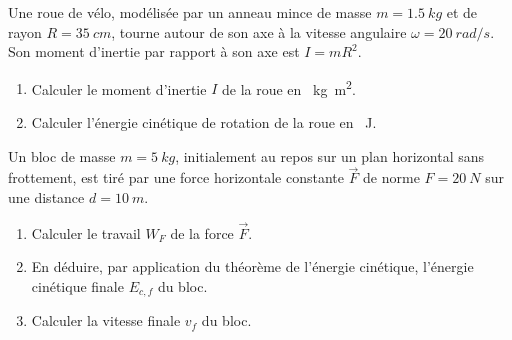 \documentclass[11pt]{article}
\begin{document}
\begin{exercice}
Une roue de vélo, modélisée par un anneau mince de masse $m = \SI{1,5}{kg}$ et de rayon $R = \SI{35}{cm}$, tourne autour de son axe à la vitesse angulaire $\omega = \SI{20}{rad/s}$. Son moment d'inertie par rapport à son axe est $I = mR^2$.
\begin{enumerate}
    \item Calculer le moment d'inertie $I$ de la roue en \SI{}{kg.m^2}.
    \item Calculer l'énergie cinétique de rotation de la roue en \SI{}{J}.
\end{enumerate}
\end{exercice}

\begin{exercice}
Un bloc de masse $m = \SI{5}{kg}$, initialement au repos sur un plan horizontal sans frottement, est tiré par une force horizontale constante $\vec{F}$ de norme $F = \SI{20}{N}$ sur une distance $d = \SI{10}{m}$.
\begin{enumerate}
    \item Calculer le travail $W_F$ de la force $\vec{F}$.
    \item En déduire, par application du théorème de l'énergie cinétique, l'énergie cinétique finale $E_{c,f}$ du bloc.
    \item Calculer la vitesse finale $v_f$ du bloc.
\end{enumerate}
\end{exercice}
\end{document}
